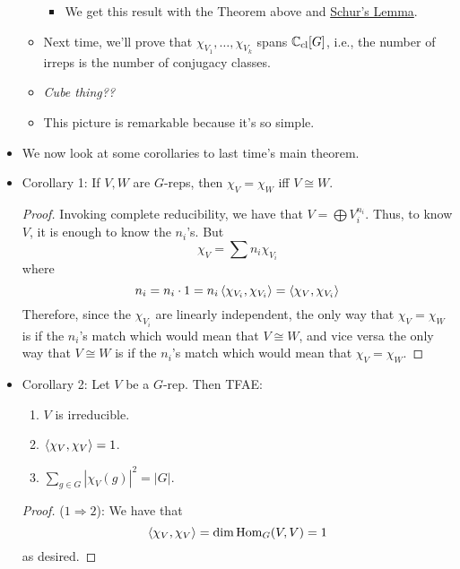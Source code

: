 \documentclass[../notes.tex]{subfiles}
\begin{document}
\begin{itemize}
\begin{itemize}
        \begin{itemize}
            \item We get this result with the Theorem above and \hyperref[lem:Schur]{Schur's Lemma}.
        \end{itemize}
        \item Next time, we'll prove that $\chi_{V_1},\dots,\chi_{V_k}$ spans $\mathbb{C}_\text{cl}[G]$, i.e., the number of irreps is the number of conjugacy classes.
        \item \emph{Cube thing??}
        \item This picture is remarkable because it's so simple.
    \end{itemize}
    \item We now look at some corollaries to last time's main theorem.
    \item Corollary 1: If $V,W$ are $G$-reps, then $\chi_V=\chi_W$ iff $V\cong W$.
    \begin{proof}
        Invoking complete reducibility, we have that $V=\bigoplus V_i^{n_i}$. Thus, to know $V$, it is enough to know the $n_i$'s. But
        \begin{equation*}
            \chi_V = \sum n_i\chi_{V_i}
        \end{equation*}
        where
        \begin{equation*}
            n_i = n_i\cdot 1 = n_i\left\langle{\chi_{V_i},\chi_{V_i}}\right\rangle = \left\langle{\chi_V,\chi_{V_i}}\right\rangle
        \end{equation*}
        Therefore, since the $\chi_{V_i}$ are linearly independent, the only way that $\chi_V=\chi_W$ is if the $n_i$'s match which would mean that $V\cong W$, and vice versa the only way that $V\cong W$ is if the $n_i$'s match which would mean that $\chi_V=\chi_W$.
    \end{proof}
    \item Corollary 2: Let $V$ be a $G$-rep. Then TFAE:
    \begin{enumerate}
        \item $V$ is irreducible.
        \item $\left\langle{\chi_V,\chi_V}\right\rangle=1$.
        \item $\sum_{g\in G}|\chi_V(g)|^2=|G|$.
    \end{enumerate}
    \begin{proof}
        ($1\Rightarrow 2$): We have that
        \begin{equation*}
            \left\langle{\chi_V,\chi_V}\right\rangle = \dim\operatorname{Hom}_G(V,V) = 1
        \end{equation*}
        as desired.\par

\end{proof}
\end{itemize}
\end{document}
